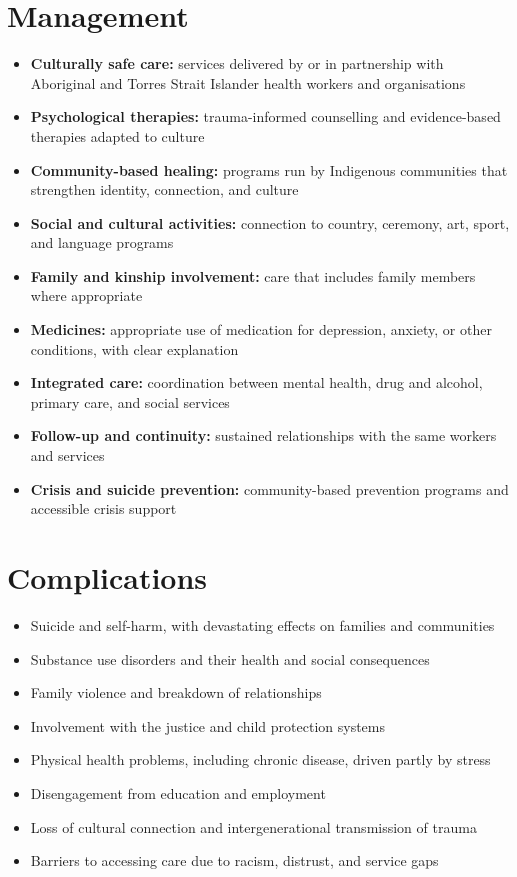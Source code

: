\section*{Management}
\begin{itemize}
    \item \textbf{Culturally safe care:} services delivered by or in partnership with Aboriginal and Torres Strait Islander health workers and organisations
    \item \textbf{Psychological therapies:} trauma-informed counselling and evidence-based therapies adapted to culture
    \item \textbf{Community-based healing:} programs run by Indigenous communities that strengthen identity, connection, and culture
    \item \textbf{Social and cultural activities:} connection to country, ceremony, art, sport, and language programs
    \item \textbf{Family and kinship involvement:} care that includes family members where appropriate
    \item \textbf{Medicines:} appropriate use of medication for depression, anxiety, or other conditions, with clear explanation
    \item \textbf{Integrated care:} coordination between mental health, drug and alcohol, primary care, and social services
    \item \textbf{Follow-up and continuity:} sustained relationships with the same workers and services
    \item \textbf{Crisis and suicide prevention:} community-based prevention programs and accessible crisis support
\end{itemize}

\section*{Complications}
\begin{itemize}
    \item Suicide and self-harm, with devastating effects on families and communities
    \item Substance use disorders and their health and social consequences
    \item Family violence and breakdown of relationships
    \item Involvement with the justice and child protection systems
    \item Physical health problems, including chronic disease, driven partly by stress
    \item Disengagement from education and employment
    \item Loss of cultural connection and intergenerational transmission of trauma
    \item Barriers to accessing care due to racism, distrust, and service gaps
\end{itemize}

